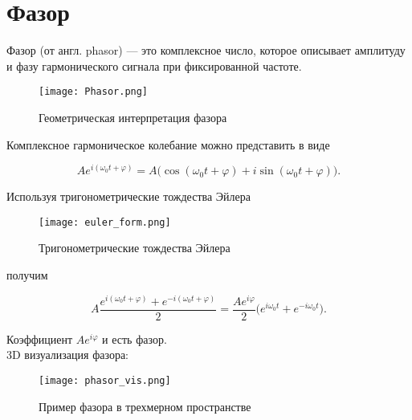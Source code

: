 \chapter{Фазор}
\label{ch:intro}

Фазор (от англ. phasor) — это комплексное число, которое описывает амплитуду и фазу гармонического сигнала при фиксированной частоте. \\

\begin{figure}[ht]
    \centering
    \texttt{[image: Phasor.png]}
    \caption{Геометрическая интерпретация фазора}
\end{figure}

Комплексное гармоническое колебание можно представить в виде

\[
A e^{i(\omega_0 t + \varphi)} = A\big(\cos(\omega_0 t + \varphi) + i\sin(\omega_0 t + \varphi)\big).
\]

Используя тригонометрические тождества Эйлера

\begin{figure}[ht]
    \centering
    \texttt{[image: euler\_form.png]}
    \caption{Тригонометрические тождества Эйлера}
\end{figure}

получим

\[
A \frac{e^{i(\omega_0 t + \varphi)} + e^{-i(\omega_0 t + \varphi)}}{2}
= \frac{A e^{i\varphi}}{2}\big(e^{i\omega_0 t} + e^{-i\omega_0 t}\big).
\]

Коэффициент \(A e^{i\varphi}\) и есть фазор.\\

3D визуализация фазора:

\begin{figure}[ht]
    \centering
    \texttt{[image: phasor\_vis.png]}
    \caption{Пример фазора в трехмерном пространстве}
\end{figure}

\endinput